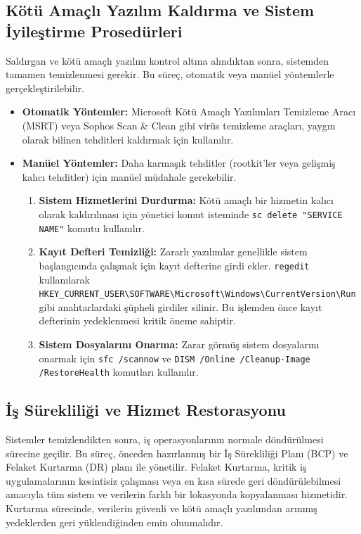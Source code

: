 \begin{itemize}
\subsection{Kötü Amaçlı Yazılım Kaldırma ve Sistem İyileştirme Prosedürleri}

Saldırgan ve kötü amaçlı yazılım kontrol altına alındıktan sonra, sistemden tamamen temizlenmesi gerekir. Bu süreç, otomatik veya manüel yöntemlerle gerçekleştirilebilir.

\begin{itemize}
    \item \textbf{Otomatik Yöntemler:} Microsoft Kötü Amaçlı Yazılımları Temizleme Aracı (MSRT) veya Sophos Scan \& Clean gibi virüs temizleme araçları, yaygın olarak bilinen tehditleri kaldırmak için kullanılır.
    \item \textbf{Manüel Yöntemler:} Daha karmaşık tehditler (rootkit'ler veya gelişmiş kalıcı tehditler) için manüel müdahale gerekebilir.
    \begin{enumerate}
        \item \textbf{Sistem Hizmetlerini Durdurma:} Kötü amaçlı bir hizmetin kalıcı olarak kaldırılması için yönetici komut isteminde \texttt{sc delete "SERVICE NAME"} komutu kullanılır.
        \item \textbf{Kayıt Defteri Temizliği:} Zararlı yazılımlar genellikle sistem başlangıcında çalışmak için kayıt defterine girdi ekler. \texttt{regedit} kullanılarak \texttt{HKEY\_CURRENT\_USER\textbackslash{}SOFTWARE\textbackslash{}Microsoft\textbackslash{}Windows\textbackslash{}CurrentVersion\textbackslash{}Run} gibi anahtarlardaki şüpheli girdiler silinir. Bu işlemden önce kayıt defterinin yedeklenmesi kritik öneme sahiptir.
        \item \textbf{Sistem Dosyalarını Onarma:} Zarar görmüş sistem dosyalarını onarmak için \texttt{sfc /scannow} ve \texttt{DISM /Online /Cleanup-Image /RestoreHealth} komutları kullanılır.
    \end{enumerate}
\end{itemize}

\subsection{İş Sürekliliği ve Hizmet Restorasyonu}

Sistemler temizlendikten sonra, iş operasyonlarının normale döndürülmesi sürecine geçilir. Bu süreç, önceden hazırlanmış bir İş Sürekliliği Planı (BCP) ve Felaket Kurtarma (DR) planı ile yönetilir. Felaket Kurtarma, kritik iş uygulamalarının kesintisiz çalışması veya en kısa sürede geri döndürülebilmesi amacıyla tüm sistem ve verilerin farklı bir lokasyonda kopyalanması hizmetidir. Kurtarma sürecinde, verilerin güvenli ve kötü amaçlı yazılımdan arınmış yedeklerden geri yüklendiğinden emin olunmalıdır.


\end{itemize}
